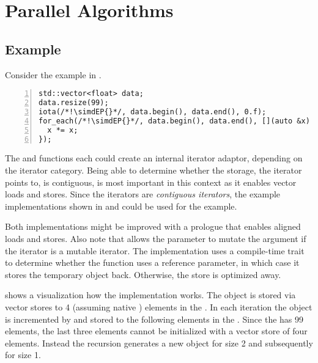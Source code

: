 \section{Parallel Algorithms}

\subsection{Example}
Consider the example in .
\begin{lstlisting}[style=Vc,numbers=left,float,label=lst:simd foreach,caption={
  Example using \simdEP with \code{iota} and \code{for_each}.
}]
std::vector<float> data;
data.resize(99);
iota(/*!\simdEP{}*/, data.begin(), data.end(), 0.f);
for_each(/*!\simdEP{}*/, data.begin(), data.end(), [](auto &x) {
  x *= x;
});
\end{lstlisting}
The  and  functions each could create an internal \simd iterator adaptor, depending on the iterator category.
Being able to determine whether the storage, the iterator points to, is contiguous, is most important in this context as it enables vector loads and stores.
Since the \std{} iterators are \emph{contiguous iterators}, the example implementations shown in  and  could be used for the example.



Both implementations might be improved with a prologue that enables aligned loads and stores.
Also note that  allows the  parameter to mutate the argument if the iterator is a mutable iterator.
The implementation uses a compile-time trait to determine whether the function  uses a reference parameter, in which case it stores the temporary \simd object back.
Otherwise, the store is optimized away.

 shows a visualization how the  implementation works.
The  \simd object is stored via vector stores to 4 (assuming native \simd[::size() == 4]) elements in the \std{}.
In each iteration the  object is incremented by \simd[::size()] and stored to the following elements in the \std{}.
Since the \std{} has 99 elements, the last three elements cannot be initialized with a vector store of four elements.
Instead the  recursion generates a new  \simd object for size 2 and subsequently for size 1.

